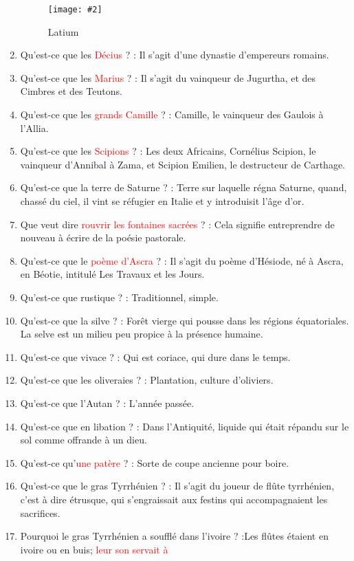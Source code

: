 \documentclass[a4paper, 11pt, hidelinks]{article}
\newcommand{\img}[4]{\begin{figure}[!ht]
    \centering
    \texttt{[image: \#2]}
    \caption{#3}
    \label{#4}
    \end{figure} }
\begin{document}
\begin{enumerate}
            \img{0.3}{Latium.png}{Latium}{86}
      \item Qu'est-ce que les \textcolor{red}{Décius} ? : Il s'agit d'une dynastie d'empereurs romains.
      \item Qu'est-ce que les \textcolor{red}{Marius} ? : Il s'agit du vainqueur de Jugurtha, et des Cimbres et des Teutons.
      \item Qu'est-ce que les \textcolor{red}{grands Camille} ? : Camille, le vainqueur des Gaulois à l'Allia.
      \item Qu'est-ce que les \textcolor{red}{Scipions} ? : Les deux Africains, Cornélius Scipion, le vainqueur d'Annibal à Zama, et Scipion Emilien,
            le destructeur de Carthage.
      \item Qu'est-ce que la terre de Saturne ? : Terre sur laquelle régna Saturne, quand, chassé du ciel, il vint se réfugier
            en Italie et y introduisit l'âge d'or.
      \item Que veut dire \textcolor{red}{rouvrir les fontaines sacrées} ? : Cela signifie entreprendre de nouveau à écrire de la poésie pastorale.
      \item Qu'est-ce que le \textcolor{red}{poème d'Ascra} ? : Il s'agit du poème d'Hésiode, né à Ascra, en Béotie, intitulé Les Travaux et les Jours.
      \item Qu'est-ce que rustique ? : Traditionnel, simple.
      \item Qu'est-ce que la silve ? : Forêt vierge qui pousse dans les régions équatoriales. La selve est un milieu peu propice à la présence humaine.
      \item Qu'est-ce que vivace ? : Qui est coriace, qui dure dans le temps.
      \item Qu'est-ce que les oliveraies ? : Plantation, culture d'oliviers.
      \item Qu'est-ce que l'Autan ? : L'année passée.
      \item Qu'est-ce que en libation ? : Dans l'Antiquité, liquide qui était répandu sur le sol comme offrande à un dieu.
      \item Qu'est-ce qu'\textcolor{red}{une patère} ? : Sorte de coupe ancienne pour boire.
      \item Qu'est-ce que le gras Tyrrhénien ? : Il s'agit du joueur de flûte tyrrhénien, c'est à dire étrusque, qui s'engraissait aux
            festins qui accompagnaient les sacrifices.
      \item Pourquoi le gras Tyrrhénien a soufflé dans l'ivoire ? :Les flûtes étaient en ivoire ou en buis; \textcolor{red}{leur son servait à
}
\end{enumerate}
\end{document}
